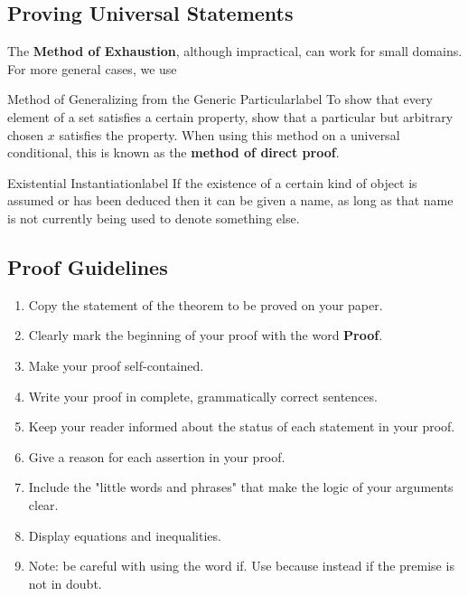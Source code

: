 \documentclass[a4paper]{report}
\begin{document}
\subsection{Proving Universal Statements}

The \textbf{Method of Exhaustion}, although impractical, can work for small domains. For more general
cases, we use

\begin{definition}{Method of Generalizing from the Generic Particular}{label}
    To show that every element of a set satisfies a certain property, show that a particular but
    arbitrary chosen $x$ satisfies the property. When using this method on a universal conditional,
    this is known as the \textbf{method of direct proof}.
\end{definition}

\begin{definition}{Existential Instantiation}{label}
    If the existence of a certain kind of object is assumed or has been deduced then it can be
    given a name, as long as that name is not currently being used to denote something else.
\end{definition}

\subsection{Proof Guidelines}

\begin{enumerate}
    \item Copy the statement of the theorem to be proved on your paper.
    \item Clearly mark the beginning of your proof with the word \textbf{Proof}.
    \item Make your proof self-contained.
    \item Write your proof in complete, grammatically correct sentences.
    \item Keep your reader informed about the status of each statement in your proof.
    \item Give a reason for each assertion in your proof.
    \item Include the "little words and phrases" that make the logic of your arguments clear.
    \item Display equations and inequalities.
    \item Note: be careful with using the word if. Use because instead if the premise is not in doubt.
\end{enumerate}
\end{document}
